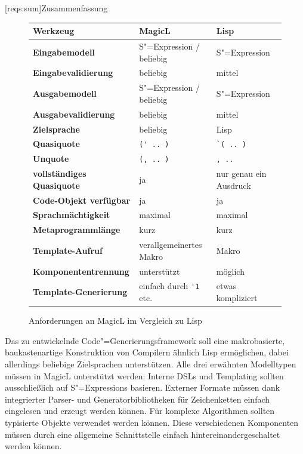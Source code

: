 \documentclass[11pt, a4paper, bibgerm]{scrbook}
\newcommand\icode[1]{\lstinline?#1?}
\newcommand\lsection{}
\newcommand{\sexp}{S"=Expression}
\newcommand{\sexps}{S"=Expressions}
\newcommand{\cgen}{Code"=Generierung}
\begin{document}
\lsection[reqs:sum]{Zusammenfassung}

\begin{figure}[h]
\begin{tabular}{|l|l|l|} \hline
\bf Werkzeug                 & \bf MagicL                    & \bf Lisp               \\\hline\hline    
\bf Eingabemodell            & \sexp{} / beliebig            & \sexp{}                \\\hline           
\bf Eingabevalidierung       & beliebig                      & mittel                 \\\hline      
\bf Ausgabemodell            & \sexp{} / beliebig            & \sexp{}                \\\hline      
\bf Ausgabevalidierung       & beliebig                      & mittel                 \\\hline      
\bf Zielsprache              & beliebig                      & Lisp                   \\\hline      
\bf Quasiquote               & \icode{(' .. )}               & \icode{`( .. )}        \\\hline   
\bf Unquote                  & \icode{(, .. )}               & \icode{, .. }          \\\hline
\bf vollständiges Quasiquote & ja                            & nur genau ein Ausdruck \\\hline      
\bf Code-Objekt verfügbar    & ja                            & ja                     \\\hline      
\bf Sprachmächtigkeit        & maximal                       & maximal                \\\hline      
\bf Metaprogrammlänge        & kurz                          & kurz                   \\\hline
\bf Template-Aufruf          & verallgemeinertes Makro       & Makro                  \\\hline      
\bf Komponententrennung      & unterstützt                   & möglich                \\\hline      
\bf Template-Generierung     & einfach durch \icode{'1} etc. & etwas kompliziert      \\\hline      
\end{tabular}
\caption{Anforderungen an MagicL im Vergleich zu Lisp}
\label{magicl:fig:reqs_sum}
\end{figure}

Das zu entwickelnde \cgen{}sframework soll eine makrobasierte,
baukastenartige Konstruktion von Compilern ähnlich Lisp ermöglichen,
dabei allerdings beliebige Zielsprachen unterstützen. Alle drei
erwähnten Modelltypen müssen in MagicL unterstützt werden: Interne DSLs
und Templating sollten ausschließlich auf \sexps{} basieren. Externer
Formate müssen dank integrierter Parser- und Generatorbibliotheken für
Zeichenketten einfach eingelesen und erzeugt werden können. Für komplexe
Algorithmen sollten typisierte Objekte verwendet werden können. Diese
verschiedenen Komponenten müssen durch eine allgemeine Schnittstelle
einfach hintereinandergeschaltet werden können.
\end{document}
